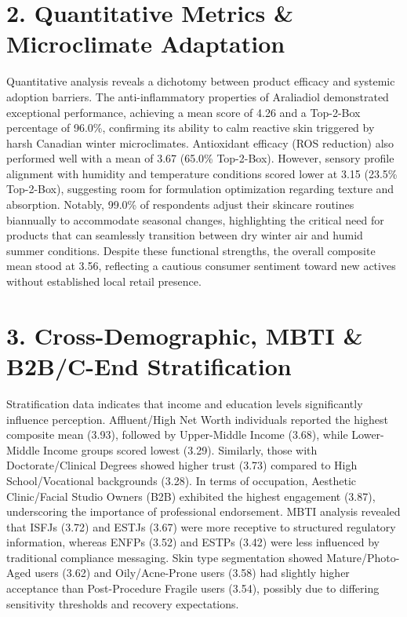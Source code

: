 \documentclass[10pt,twocolumn,a4paper]{article}
\begin{document}
\section{2. Quantitative Metrics \& Microclimate Adaptation}
Quantitative analysis reveals a dichotomy between product efficacy and systemic adoption barriers. The anti-inflammatory properties of Araliadiol demonstrated exceptional performance, achieving a mean score of 4.26 and a Top-2-Box percentage of 96.0\%, confirming its ability to calm reactive skin triggered by harsh Canadian winter microclimates. Antioxidant efficacy (ROS reduction) also performed well with a mean of 3.67 (65.0\% Top-2-Box). However, sensory profile alignment with humidity and temperature conditions scored lower at 3.15 (23.5\% Top-2-Box), suggesting room for formulation optimization regarding texture and absorption. Notably, 99.0\% of respondents adjust their skincare routines biannually to accommodate seasonal changes, highlighting the critical need for products that can seamlessly transition between dry winter air and humid summer conditions. Despite these functional strengths, the overall composite mean stood at 3.56, reflecting a cautious consumer sentiment toward new actives without established local retail presence.
\section{3. Cross-Demographic, MBTI \& B2B/C-End Stratification}
Stratification data indicates that income and education levels significantly influence perception. Affluent/High Net Worth individuals reported the highest composite mean (3.93), followed by Upper-Middle Income (3.68), while Lower-Middle Income groups scored lowest (3.29). Similarly, those with Doctorate/Clinical Degrees showed higher trust (3.73) compared to High School/Vocational backgrounds (3.28). In terms of occupation, Aesthetic Clinic/Facial Studio Owners (B2B) exhibited the highest engagement (3.87), underscoring the importance of professional endorsement. MBTI analysis revealed that ISFJs (3.72) and ESTJs (3.67) were more receptive to structured regulatory information, whereas ENFPs (3.52) and ESTPs (3.42) were less influenced by traditional compliance messaging. Skin type segmentation showed Mature/Photo-Aged users (3.62) and Oily/Acne-Prone users (3.58) had slightly higher acceptance than Post-Procedure Fragile users (3.54), possibly due to differing sensitivity thresholds and recovery expectations.
\end{document}
